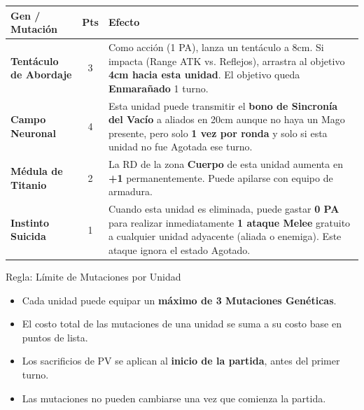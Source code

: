 \begin{tcolorbox}[enhanced, colback=AbyssalBlue!15, colframe=VoidPurple,
    title={\large \textbf{CATÁLOGO DE MUTACIONES — NIVEL AVANZADO}}
    , boxed title style={colback=BloodPurple, coltext=white}]
\begin{tabularx}{\linewidth}{l|c|X}
\rowcolor{VoidPurple!15} \textbf{Gen / Mutación} & \textbf{Pts} & \textbf{Efecto} \\ \hline

\textbf{Tentáculo de Abordaje} & 3 &
Como acción (1 PA), lanza un tentáculo a 8cm. Si impacta (Range ATK vs. Reflejos), arrastra al objetivo \textbf{4cm hacia esta unidad}. El objetivo queda \textbf{Enmarañado} 1 turno. \\ \hline

\textbf{Campo Neuronal} & 4 &
Esta unidad puede transmitir el \textbf{bono de Sincronía del Vacío} a aliados en 20cm aunque no haya un Mago presente, pero solo \textbf{1 vez por ronda} y solo si esta unidad no fue Agotada ese turno. \\ \hline

\textbf{Médula de Titanio} & 2 &
La RD de la zona \textbf{Cuerpo} de esta unidad aumenta en \textbf{+1} permanentemente. Puede apilarse con equipo de armadura. \\ \hline

\textbf{Instinto Suicida} & 1 &
Cuando esta unidad es eliminada, puede gastar \textbf{0 PA} para realizar inmediatamente \textbf{1 ataque Melee} gratuito a cualquier unidad adyacente (aliada o enemiga). Este ataque ignora el estado Agotado. \\ \hline

\end{tabularx}
\end{tcolorbox}

\vspace{0.4cm}

\begin{reglabiskrida}{Regla: Límite de Mutaciones por Unidad}
\begin{itemize}
    \item Cada unidad puede equipar un \textbf{máximo de 3 Mutaciones Genéticas}.
    \item El costo total de las mutaciones de una unidad se suma a su costo base en puntos de lista.
    \item Los sacrificios de PV se aplican al \textbf{inicio de la partida}, antes del primer turno.
    \item Las mutaciones no pueden cambiarse una vez que comienza la partida.
\end{itemize}
\end{reglabiskrida}